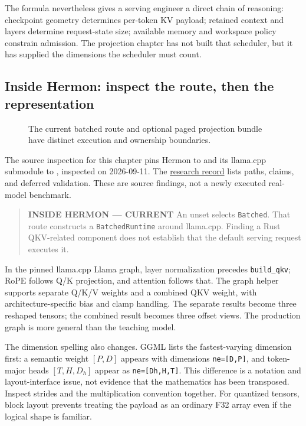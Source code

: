 \documentclass[
  10pt,
]{article}
\begin{document}
The formula nevertheless gives a serving engineer a direct chain of
reasoning: checkpoint geometry determines per-token KV payload; retained
context and layers determine request-state size; available memory and
workspace policy constrain admission. The projection chapter has not
built that scheduler, but it has supplied the dimensions the scheduler
must count.

\subsection{Inside Hermon: inspect the route, then the
representation}\label{inside-hermon-inspect-the-route-then-the-representation}

\begin{figure}[H]\centering\resizebox{\linewidth}{!}{}\caption{The current batched route and optional paged projection bundle have distinct execution and ownership boundaries.}\end{figure}

The source inspection for this chapter pins Hermon to
\texttt{} and its
llama.cpp submodule to
\texttt{}, inspected
on 2026-09-11. The
\href{https://github.com/hermonai/inside-the-llm-engine/blob/astra-visual-rewrite/research/part-02/chapter-08-queries-keys-and-values.md}{research
record} lists paths, claims, and deferred validation. These are source
findings, not a newly executed real-model benchmark.

\begin{quote}
\textbf{INSIDE HERMON --- CURRENT} An unset
\texttt{} selects \texttt{Batched}. That
route constructs a \texttt{BatchedRuntime} around llama.cpp. Finding a
Rust QKV-related component does not establish that the default serving
request executes it.
\end{quote}

In the pinned llama.cpp Llama graph, layer normalization precedes
\texttt{build\_qkv}; RoPE follows Q/K projection, and attention follows
that. The graph helper supports separate Q/K/V weights and a combined
QKV weight, with architecture-specific bias and clamp handling. The
separate results become three reshaped tensors; the combined result
becomes three offset views. The production graph is more general than
the teaching model.

The dimension spelling also changes. GGML lists the fastest-varying
dimension first: a semantic weight \([P,D]\) appears with dimensions
\texttt{ne={[}D,P{]}}, and token-major heads \([T,H,D_h]\) appear as
\texttt{ne={[}Dh,H,T{]}}. This difference is a notation and
layout-interface issue, not evidence that the mathematics has been
transposed. Inspect strides and the multiplication convention together.
For quantized tensors, block layout prevents treating the payload as an
ordinary F32 array even if the logical shape is familiar.
\end{document}

